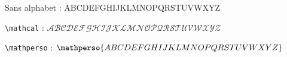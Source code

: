 \documentclass[varwidth, border = 3pt]{standalone}
\newcommand\alphabet{ABCDEFGHIJKLMNOPQRSTUVWXYZ}
\begin{document}
Sans alphabet : \alphabet

\verb#\mathcal# : $\mathcal{\alphabet}$

\verb#\mathperso# : $\mathperso{\alphabet}$
\end{document}
